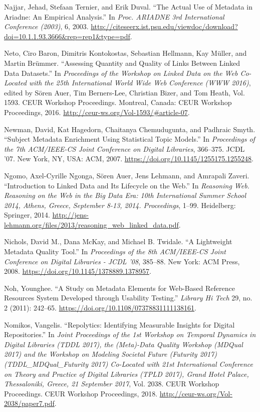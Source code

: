 Najjar, Jehad, Stefaan Ternier, and Erik Duval. “The Actual Use of Metadata in Ariadne: An Empirical Analysis.” In \emph{Proc. ARIADNE 3rd International Conference (2003)}, 6, 2003. \url{http://citeseerx.ist.psu.edu/viewdoc/download?doi=10.1.1.93.3666\&rep=rep1\&type=pdf}.

Neto, Ciro Baron, Dimitris Kontokostas, Sebastian Hellmann, Kay Müller, and Martin Brümmer. “Assessing Quantity and Quality of Links Between Linked Data Datasets.” In \emph{Proceedings of the Workshop on Linked Data on the Web Co-Located with the 25th International World Wide Web Conference (WWW 2016)}, edited by Sören Auer, Tim Berners-Lee, Christian Bizer, and Tom Heath, Vol. 1593. CEUR Workshop Proceedings. Montreal, Canada: CEUR Workshop Proceedings, 2016. \url{http://ceur-ws.org/Vol-1593/#article-07}.

Newman, David, Kat Hagedorn, Chaitanya Chemudugunta, and Padhraic Smyth. “Subject Metadata Enrichment Using Statistical Topic Models.” In \emph{Proceedings of the 7th ACM/IEEE-CS Joint Conference on Digital Libraries}, 366–375. JCDL ’07. New York, NY, USA: ACM, 2007. \url{https://doi.org/10.1145/1255175.1255248}.

Ngomo, Axel-Cyrille Ngonga, Sören Auer, Jens Lehmann, and Amrapali Zaveri. “Introduction to Linked Data and Its Lifecycle on the Web.” In \emph{Reasoning Web. Reasoning on the Web in the Big Data Era: 10th International Summer School 2014, Athens, Greece, September 8-13, 2014. Proceedings}, 1–99. Heidelberg: Springer, 2014. \url{http://jens-lehmann.org/files/2013/reasoning_web_linked_data.pdf}.

Nichols, David M., Dana McKay, and Michael B. Twidale. “A Lightweight Metadata Quality Tool.” In \emph{Proceedings of the 8th ACM/IEEE-CS Joint Conference on Digital Libraries - JCDL ’08}, 385–88. New York: ACM Press, 2008. \url{https://doi.org/10.1145/1378889.1378957}.

Noh, Younghee. “A Study on Metadata Elements for Web-Based Reference Resources System Developed through Usability Testing.” \emph{Library Hi Tech} 29, no. 2 (2011): 242–65. \url{https://doi.org/10.1108/07378831111138161}.

Nomikos, Vangelis. “Repolytics: Identifying Measurable Insights for Digital Repositories.” In \emph{Joint Proceedings of the 1st Workshop on Temporal Dynamics in Digital Libraries (TDDL 2017), the (Meta)-Data Quality Workshop (MDQual 2017) and the Workshop on Modeling Societal Future (Futurity 2017) (TDDL\_MDQual\_Futurity 2017) Co-Located with 21st International Conference on Theory and Practice of Digital Libraries (TPLD 2017), Grand Hotel Palace, Thessaloniki, Greece, 21 September 2017}, Vol. 2038. CEUR Workshop Proceedings. CEUR Workshop Proceedings, 2018. \url{http://ceur-ws.org/Vol-2038/paper7.pdf}.

